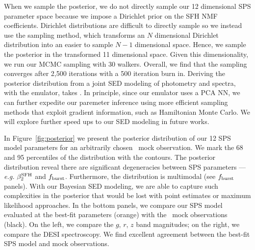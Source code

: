 When we sample the posterior, we do not directly sample our 12 dimensional
SPS parameter space because we impose a Dirichlet prior on the SFH NMF
coefficients. 
Dirichlet distributions are difficult to directly sample so we instead use the
\cite{betancourt2012} sampling method, which transforms an $N$ dimensional
Dirichlet distribution into an easier to sample $N-1$ dimensional space.
Hence, we sample the posterior in the transformed 11 dimensional space. 
Given this dimensionality, we run our MCMC sampling with 30 walkers.
Overall, we find that the sampling converges after 2,500 iterations with a 500
iteration burn in. 
Deriving the posterior distribution from a joint SED modeling of photometry and
spectra, with the emulator, takes . 
In principle, since our emulator uses a PCA NN, we can further expedite our
paremeter inference using more efficient sampling methods that exploit gradient
information, such as Hamiltonian Monte Carlo.  
We will explore further speed ups to our SED modeling in future works. 

In Figure~\ref{fig:posterior} we present the posterior distribution of our 12
SPS model parameters for an arbitrarily chosen \lgal~mock observation. 
We mark the 68 and 95 percentiles of the distribution with the contours. 
The posterior distribution reveal there are significant degeneracies between
SPS parameters --- \emph{e.g.} $\beta_2^{\rm SFH}$ and $f_{\rm burst}$. 
Furthermore, the distribution is multimodal (see $f_{\rm burst}$ panels). 
With our Bayesian SED modeling, we are able to capture such complexities in the
posterior that would be lost with point estimates or maximum likelihood
approaches.
In the bottom panels, we compare our SPS model evaluated at the best-fit
parameters (orange) with the \lgal~mock observations (black). 
On the left, we compare the $g$, $r$, $z$ band magnitudes; on the right, we
compare the DESI spectroscopy. 
We find excellent agreement between the best-fit SPS model and mock
observations.
